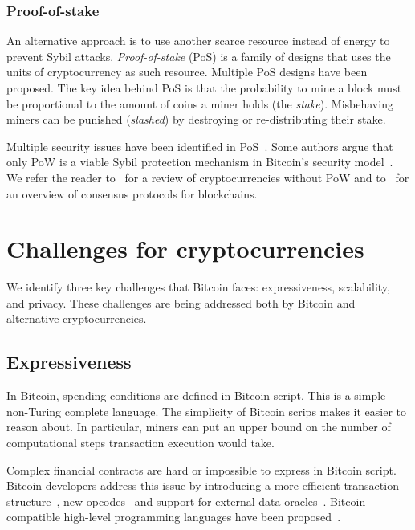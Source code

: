 \subsubsection*{Proof-of-stake}

An alternative approach is to use another scarce resource instead of energy to prevent Sybil attacks.
\textit{Proof-of-stake} (PoS) is a family of designs that uses the units of cryptocurrency as such resource.
Multiple PoS designs have been proposed.
The key idea behind PoS is that the probability to mine a block must be proportional to the amount of coins a miner holds (the \textit{stake}).
Misbehaving miners can be punished (\textit{slashed}) by destroying or re-distributing their stake.

Multiple security issues have been identified in PoS~\cite{Fanti2019,Gazi2018,BrownCohen2019,Chitra2020}.
Some authors argue that only PoW is a viable Sybil protection mechanism in Bitcoin's security model~\cite{Andreev2014, Sztorc2015, Poelstra2015}.
We refer the reader to~\cite{Bentov2016} for a review of cryptocurrencies without PoW and to~\cite{Bano2019} for an overview of consensus protocols for blockchains.



\section{Challenges for cryptocurrencies}

We identify three key challenges that Bitcoin faces: expressiveness, scalability, and privacy.
These challenges are being addressed both by Bitcoin and alternative cryptocurrencies.


\subsection{Expressiveness}

In Bitcoin, spending conditions are defined in Bitcoin script.
This is a simple non-Turing complete language.
The simplicity of Bitcoin scrips makes it easier to reason about.
In particular, miners can put an upper bound on the number of computational steps transaction execution would take.

Complex financial contracts are hard or impossible to express in Bitcoin script.
Bitcoin developers address this issue by introducing a more efficient transaction structure~\cite{Wuille2020}, new opcodes~\cite{Rubin2020} and support for external data oracles~\cite{Dryja}.
Bitcoin-compatible high-level programming languages have been proposed~\cite{OConnor2017, Wuille2019}.

